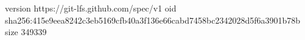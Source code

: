 version https://git-lfs.github.com/spec/v1
oid sha256:415e9eea8242c3eb5169cfb40a3f136e66cabd7458bc2342028d5f6a3901b78b
size 349339
